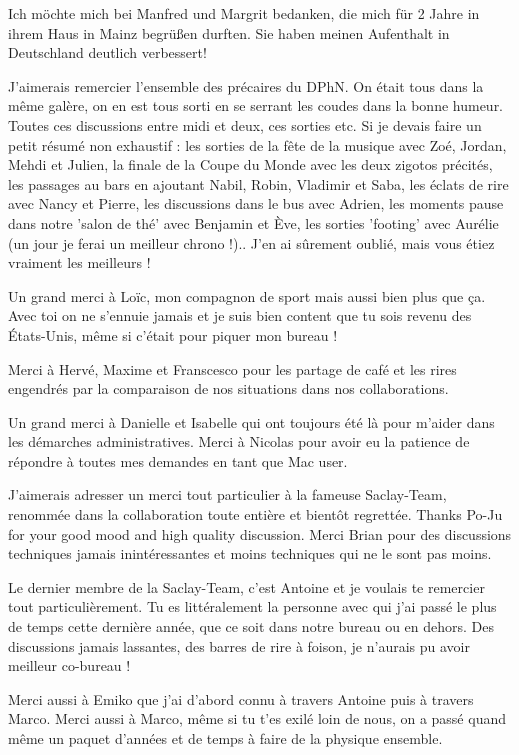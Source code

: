 Ich möchte mich bei Manfred und Margrit bedanken, die mich für 2 Jahre in ihrem Haus in Mainz begrüßen durften. Sie haben meinen Aufenthalt in Deutschland deutlich verbessert!

J'aimerais remercier l'ensemble des précaires du DPhN. On était tous dans la même galère, on en est tous sorti en se serrant les coudes dans la bonne humeur. Toutes ces discussions entre midi et deux, ces sorties etc. Si je devais faire un petit résumé non exhaustif : les sorties de la fête de la musique avec Zoé, Jordan, Mehdi et Julien, la finale de la Coupe du Monde avec les deux zigotos précités, les passages au bars en ajoutant Nabil, Robin, Vladimir et Saba, les éclats de rire avec Nancy et Pierre, les discussions dans le bus avec Adrien, les moments pause dans notre 'salon de thé' avec Benjamin et Ève, les sorties 'footing' avec Aurélie (un jour je ferai un meilleur chrono !).. J'en ai sûrement oublié, mais vous étiez vraiment les meilleurs !

Un grand merci à Loïc, mon compagnon de sport mais aussi bien plus que ça. Avec toi on ne s'ennuie jamais et je suis bien content que tu sois revenu des États-Unis, même si c'était pour piquer mon bureau !

Merci à Hervé, Maxime et Franscesco pour les partage de café et les rires engendrés par la comparaison de nos situations dans nos collaborations.

Un grand merci à Danielle et Isabelle qui ont toujours été là pour m'aider dans les démarches administratives. Merci à Nicolas pour avoir eu la patience de répondre à toutes mes demandes en tant que Mac user.

J'aimerais adresser un merci tout particulier à la fameuse Saclay-Team, renommée dans la collaboration toute entière et bientôt regrettée. Thanks Po-Ju for your good mood and high quality discussion. Merci Brian pour des discussions techniques jamais inintéressantes et moins techniques qui ne le sont pas moins.

Le dernier membre de la Saclay-Team, c'est Antoine et je voulais te remercier tout particulièrement. Tu es littéralement la personne avec qui j'ai passé le plus de temps cette dernière année, que ce soit dans notre bureau ou en dehors. Des discussions jamais lassantes, des barres de rire à foison, je n'aurais pu avoir meilleur co-bureau !

Merci aussi à Emiko que j'ai d'abord connu à travers Antoine puis à travers Marco. Merci aussi à Marco, même si tu t'es exilé loin de nous, on a passé quand même un paquet d'années et de temps à faire de la physique ensemble.

